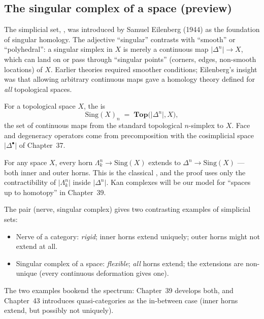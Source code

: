 \subsection{The singular complex of a space (preview)}

\begin{nameorigin}
The  simplicial set, , was
introduced by Samuel Eilenberg (1944) as the foundation of singular
homology. The adjective ``singular'' contrasts with ``smooth'' or
``polyhedral'': a singular simplex in $X$ is merely a continuous map
$\lvert\Delta^n\rvert \to X$, which can land on or pass through
``singular points'' (corners, edges, non-smooth locations) of $X$.
Earlier theories required smoother conditions; Eilenberg's insight was
that allowing arbitrary continuous maps gave a homology theory defined
for \emph{all} topological spaces.
\end{nameorigin}

\begin{example_thm}
\label{ex:singular}
For a topological space $X$, the  is
\begin{equation*}
  \mathrm{Sing}(X)_n \;=\; \mathbf{Top}\bigl(\lvert\Delta^n\rvert, X\bigr),
\end{equation*}
the set of continuous maps from the standard topological $n$-simplex to
$X$. Face and degeneracy operators come from precomposition with the
cosimplicial space $\lvert\Delta^\bullet\rvert$ of Chapter~37.
\end{example_thm}

\begin{remark}
For any space $X$, every horn $\Lambda^n_k \to \mathrm{Sing}(X)$ extends
to $\Delta^n \to \mathrm{Sing}(X)$ — both inner and outer horns. This is
the classical , and the proof uses only the
contractibility of $\lvert\Lambda^n_k\rvert$ inside $\lvert\Delta^n\rvert$.
Kan complexes will be our model for ``spaces up to homotopy'' in
Chapter~39.
\end{remark}

\begin{readernote}
The pair (nerve, singular complex) gives two contrasting examples of
simplicial sets:
\begin{itemize}
  \item Nerve of a category: \emph{rigid}; inner horns extend uniquely;
        outer horns might not extend at all.
  \item Singular complex of a space: \emph{flexible}; \emph{all} horns
        extend; the extensions are non-unique (every continuous
        deformation gives one).
\end{itemize}
The two examples bookend the spectrum: Chapter~39 develops both, and
Chapter~43 introduces quasi-categories as the in-between case
(inner horns extend, but possibly not uniquely).
\end{readernote}


